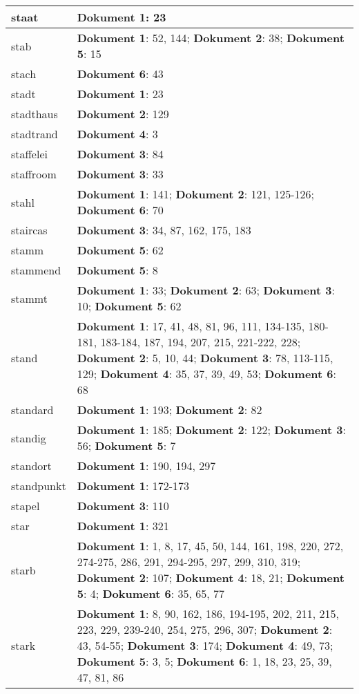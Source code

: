 \documentclass[a5paper]{article}
\begin{document}
\begin{longtable}[l]{|l|p{3in}|}
\hline
staat & \textbf{Dokument 1}: 23 \\
\hline
stab & \textbf{Dokument 1}: 52, 144; \textbf{Dokument 2}: 38; \textbf{Dokument 5}: 15 \\
\hline
stach & \textbf{Dokument 6}: 43 \\
\hline
stadt & \textbf{Dokument 1}: 23 \\
\hline
stadthaus & \textbf{Dokument 2}: 129 \\
\hline
stadtrand & \textbf{Dokument 4}: 3 \\
\hline
staffelei & \textbf{Dokument 3}: 84 \\
\hline
staffroom & \textbf{Dokument 3}: 33 \\
\hline
stahl & \textbf{Dokument 1}: 141; \textbf{Dokument 2}: 121, 125-126; \textbf{Dokument 6}: 70 \\
\hline
staircas & \textbf{Dokument 3}: 34, 87, 162, 175, 183 \\
\hline
stamm & \textbf{Dokument 5}: 62 \\
\hline
stammend & \textbf{Dokument 5}: 8 \\
\hline
stammt & \textbf{Dokument 1}: 33; \textbf{Dokument 2}: 63; \textbf{Dokument 3}: 10; \textbf{Dokument 5}: 62 \\
\hline
stand & \textbf{Dokument 1}: 17, 41, 48, 81, 96, 111, 134-135, 180-181, 183-184, 187, 194, 207, 215, 221-222, 228; \textbf{Dokument 2}: 5, 10, 44; \textbf{Dokument 3}: 78, 113-115, 129; \textbf{Dokument 4}: 35, 37, 39, 49, 53; \textbf{Dokument 6}: 68 \\
\hline
standard & \textbf{Dokument 1}: 193; \textbf{Dokument 2}: 82 \\
\hline
standig & \textbf{Dokument 1}: 185; \textbf{Dokument 2}: 122; \textbf{Dokument 3}: 56; \textbf{Dokument 5}: 7 \\
\hline
standort & \textbf{Dokument 1}: 190, 194, 297 \\
\hline
standpunkt & \textbf{Dokument 1}: 172-173 \\
\hline
stapel & \textbf{Dokument 3}: 110 \\
\hline
star & \textbf{Dokument 1}: 321 \\
\hline
starb & \textbf{Dokument 1}: 1, 8, 17, 45, 50, 144, 161, 198, 220, 272, 274-275, 286, 291, 294-295, 297, 299, 310, 319; \textbf{Dokument 2}: 107; \textbf{Dokument 4}: 18, 21; \textbf{Dokument 5}: 4; \textbf{Dokument 6}: 35, 65, 77 \\
\hline
stark & \textbf{Dokument 1}: 8, 90, 162, 186, 194-195, 202, 211, 215, 223, 229, 239-240, 254, 275, 296, 307; \textbf{Dokument 2}: 43, 54-55; \textbf{Dokument 3}: 174; \textbf{Dokument 4}: 49, 73; \textbf{Dokument 5}: 3, 5; \textbf{Dokument 6}: 1, 18, 23, 25, 39, 47, 81, 86 \\

\end{longtable}
\end{document}
